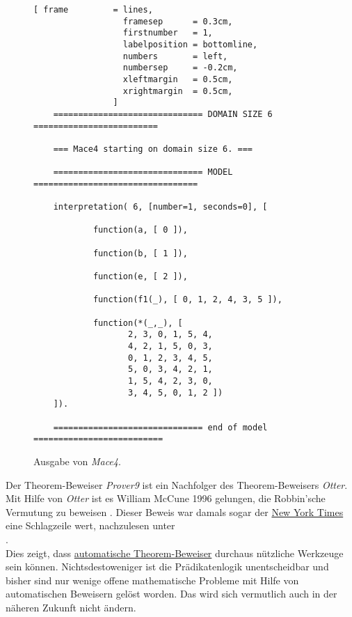 \begin{figure}[!ht]
\centering
\begin{Verbatim}[ frame         = lines, 
                  framesep      = 0.3cm, 
                  firstnumber   = 1,
                  labelposition = bottomline,
                  numbers       = left,
                  numbersep     = -0.2cm,
                  xleftmargin   = 0.5cm,
                  xrightmargin  = 0.5cm,
                ]
    ============================== DOMAIN SIZE 6 =========================
    
    === Mace4 starting on domain size 6. ===
    
    ============================== MODEL =================================
    
    interpretation( 6, [number=1, seconds=0], [
    
            function(a, [ 0 ]),
    
            function(b, [ 1 ]),
    
            function(e, [ 2 ]),
    
            function(f1(_), [ 0, 1, 2, 4, 3, 5 ]),
    
            function(*(_,_), [
    			   2, 3, 0, 1, 5, 4,
    			   4, 2, 1, 5, 0, 3,
    			   0, 1, 2, 3, 4, 5,
    			   5, 0, 3, 4, 2, 1,
    			   1, 5, 4, 2, 3, 0,
    			   3, 4, 5, 0, 1, 2 ])
    ]).
    
    ============================== end of model ==========================
\end{Verbatim}
\vspace*{-0.3cm}
\caption{Ausgabe von \textsl{Mace4}.}
\label{fig:group.out}
\end{figure}

\remark
Der Theorem-Beweiser \textsl{Prover9} ist ein Nachfolger des Theorem-Beweisers \textsl{Otter}.  Mit Hilfe von
\textsl{Otter} ist es William McCune 1996 gelungen, die Robbin'sche Vermutung zu beweisen \cite{mccune:1997}.
Dieser Beweis war damals sogar der \href{http://www.nytimes.com/}{New York Times} eine Schlagzeile wert,
nachzulesen unter
\\[0.2cm]
\hspace*{1.3cm}
\href{http://www.nytimes.com/library/cyber/week/1210math.html}{}.
\\[0.2cm]
Dies zeigt, dass \href{https://en.wikipedia.org/wiki/Automated_theorem_proving}{automatische Theorem-Beweiser}
durchaus nützliche Werkzeuge sein können.  Nichtsdestoweniger ist die Prädikatenlogik unentscheidbar und bisher
sind  nur wenige offene mathematische Probleme mit Hilfe von automatischen Beweisern gelöst worden.  Das wird
sich vermutlich auch in der näheren Zukunft nicht ändern.  \eox
\pagebreak


